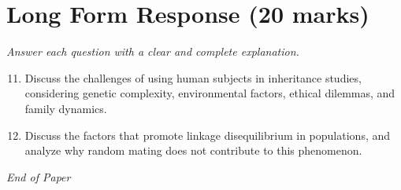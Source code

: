 \documentclass[12pt]{article}
\begin{document}
\section*{Long Form Response (20 marks)}
\textit{Answer each question with a clear and complete explanation.}
\begin{enumerate}[label=\arabic*.]
\setcounter{enumi}{10}
\item Discuss the challenges of using human subjects in inheritance studies, considering genetic complexity, environmental factors, ethical dilemmas, and family dynamics.
\item Discuss the factors that promote linkage disequilibrium in populations, and analyze why random mating does not contribute to this phenomenon.
\end{enumerate}

\vfill
\noindent\textit{End of Paper}
\end{document}
